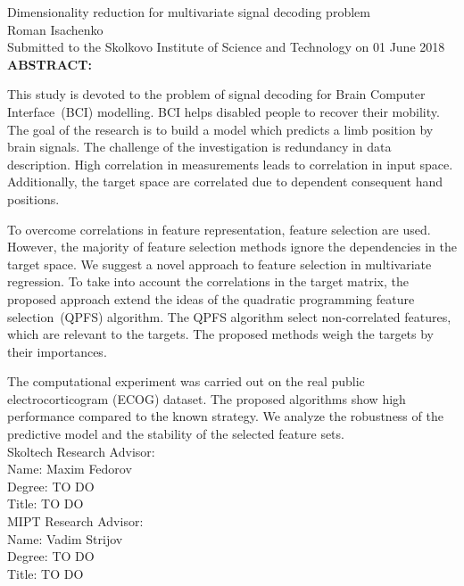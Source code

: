 \documentclass[12pt,oneside]{article}
\theoremstyle{definition}
\begin{document}
\setcounter{page}{3}
\begin{center}
	Dimensionality reduction for multivariate signal decoding problem\\ 
	Roman Isachenko \\[5mm]
	Submitted to the Skolkovo Institute of Science and Technology 
	on 01 June 2018 \\[5mm]
	\textbf{ABSTRACT:} 
\end{center}

This study is devoted to the problem of signal decoding for Brain Computer Interface~(BCI) modelling. 
BCI helps disabled people to recover their mobility.
The goal of the research is to build a model which predicts a limb position by brain signals. 
The challenge of the investigation is redundancy in data description. 
High correlation in measurements leads to correlation in input space. 
Additionally, the target space are correlated due to dependent consequent hand positions.

To overcome correlations in feature representation, feature selection are used.
However, the majority of feature selection methods ignore the dependencies in the target space.
We suggest a novel approach to feature selection in multivariate regression.
To take into account the correlations in the target matrix, the proposed approach extend the ideas of the quadratic programming feature selection~(QPFS) algorithm. 
The QPFS algorithm select non-correlated features, which are relevant to the targets. The proposed methods weigh the targets by their importances.

The computational experiment was carried out on the real public electrocorticogram (ECOG) dataset. 
The proposed algorithms show high performance compared to the known strategy.
We analyze the robustness of the predictive model and the stability of the selected feature sets.\\[5mm]
Skoltech Research Advisor: \\
Name: Maxim Fedorov \\
Degree: {\color{red} TO DO} \\
Title: {\color{red} TO DO} \\[5mm]
MIPT Research Advisor: \\
Name: Vadim Strijov \\
Degree:{\color{red} TO DO} \\
Title: {\color{red} TO DO}

\newpage
\tableofcontents

\newpage
\end{document}
